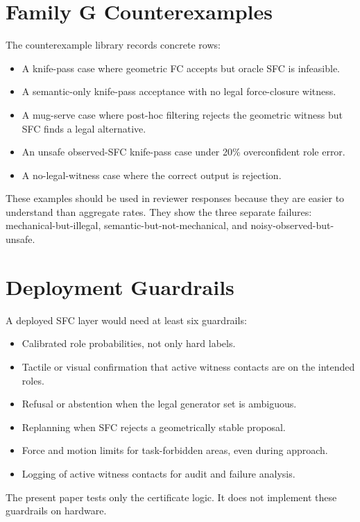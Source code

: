 \documentclass{article}
\begin{document}
\section{Family G Counterexamples}

The counterexample library records concrete rows:
\begin{itemize}
\item A knife-pass case where geometric FC accepts but oracle SFC is infeasible.
\item A semantic-only knife-pass acceptance with no legal force-closure witness.
\item A mug-serve case where post-hoc filtering rejects the geometric witness but SFC finds a legal alternative.
\item An unsafe observed-SFC knife-pass case under 20\% overconfident role error.
\item A no-legal-witness case where the correct output is rejection.
\end{itemize}

These examples should be used in reviewer responses because they are easier to understand than aggregate rates. They show the three separate failures: mechanical-but-illegal, semantic-but-not-mechanical, and noisy-observed-but-unsafe.

\section{Deployment Guardrails}

A deployed SFC layer would need at least six guardrails:

\begin{itemize}
\item Calibrated role probabilities, not only hard labels.
\item Tactile or visual confirmation that active witness contacts are on the intended roles.
\item Refusal or abstention when the legal generator set is ambiguous.
\item Replanning when SFC rejects a geometrically stable proposal.
\item Force and motion limits for task-forbidden areas, even during approach.
\item Logging of active witness contacts for audit and failure analysis.
\end{itemize}

The present paper tests only the certificate logic. It does not implement these guardrails on hardware.
\end{document}
